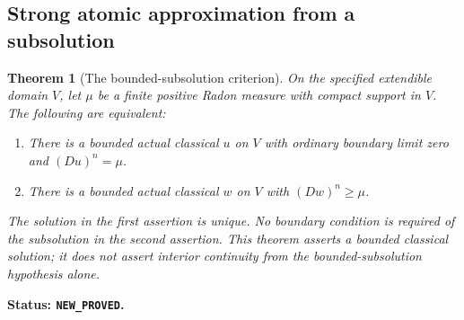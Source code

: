 \documentclass[11pt,a4paper]{article}
\numberwithin{equation}{section}
\newtheorem{theorem}{Theorem}[section]
\theoremstyle{definition}
\theoremstyle{remark}
\begin{document}
\subsection{Strong atomic approximation from a subsolution}

\begin{theorem}[The bounded-subsolution criterion]
\label{thm:r3-bounded-subsolution-dirichlet}
On the specified extendible domain $V$, let $\mu$ be a finite
positive Radon measure with compact support in $V$.  The following
are equivalent:
\begin{enumerate}
\item There is a bounded actual classical $u$ on $V$ with ordinary
boundary limit zero and $(Du)^n=\mu$.
\item There is a bounded actual classical $w$ on $V$ with
$(Dw)^n\geq\mu$.
\end{enumerate}
The solution in the first assertion is unique.  No boundary
condition is required of the subsolution in the second assertion.
This theorem asserts a bounded classical solution; it does not
assert interior continuity from the bounded-subsolution hypothesis
alone.
\end{theorem}

\noindent\textbf{Status: \texttt{NEW\_PROVED}.}
\end{document}
